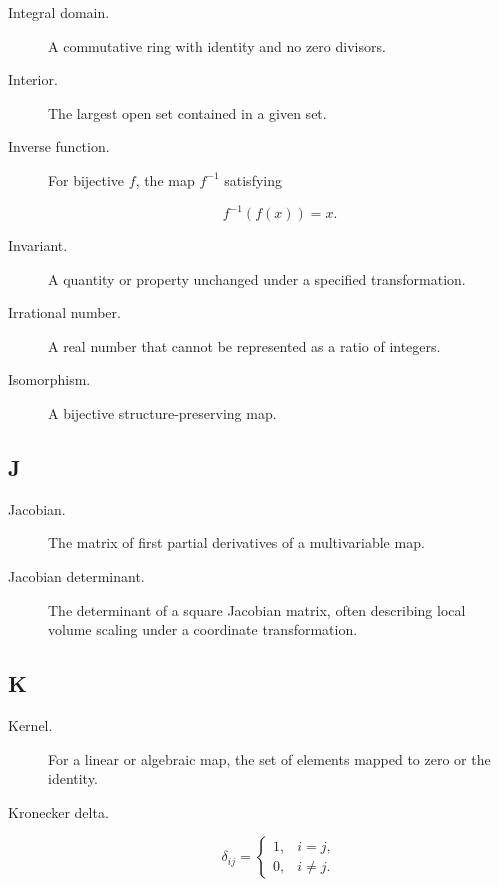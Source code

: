 \begin{description}
\item[Integral domain.]
A commutative ring with identity and no zero divisors.

\item[Interior.]
The largest open set contained in a given set.

\item[Inverse function.]
For bijective \(f\), the map \(f^{-1}\) satisfying

\[
f^{-1}(f(x))=x.
\]

\item[Invariant.]
A quantity or property unchanged under a specified transformation.

\item[Irrational number.]
A real number that cannot be represented as a ratio of integers.

\item[Isomorphism.]
A bijective structure-preserving map.

\end{description}

\subsection*{J}

\begin{description}

\item[Jacobian.]
The matrix of first partial derivatives of a multivariable map.

\item[Jacobian determinant.]
The determinant of a square Jacobian matrix, often describing local volume
scaling under a coordinate transformation.

\end{description}

\subsection*{K}

\begin{description}

\item[Kernel.]
For a linear or algebraic map, the set of elements mapped to zero or the
identity.

\item[Kronecker delta.]

\[
\delta_{ij}
=
\begin{cases}
1, & i=j,\\
0, & i\neq j.
\end{cases}
\]

\end{description}

